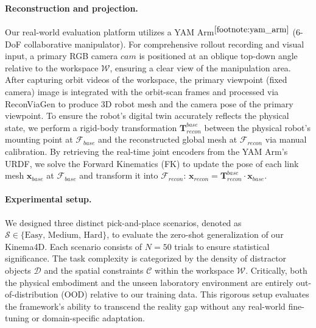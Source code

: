 \begin{appendices}
\paragraph{Reconstruction and projection.}
Our real-world evaluation platform utilizes a YAM Arm$^{\ref{footnote:yam_arm}}$ (6-DoF collaborative manipulator). 
For comprehensive rollout recording and visual input, a primary RGB camera $cam$ is positioned at an oblique top-down angle relative to the workspace $\mathcal{W}$, ensuring a clear view of the manipulation area. After capturing orbit videos of the workspace, the primary viewpoint (fixed camera) image is integrated with the orbit-scan frames and processed via ReconViaGen \cite{chang2025reconviagen} to produce 3D robot mesh and the camera pose of the primary viewpoint. To ensure the robot's digital twin accurately reflects the physical state, we perform a rigid-body transformation $\mathbf{T}_{recon}^{base}$ between the physical robot's mounting point at $\mathcal{F}_{base}$ and the reconstructed global mesh at $\mathcal{F}_{recon}$ via manual calibration. 
By retrieving the real-time joint encoders from the YAM Arm’s URDF, we solve the Forward Kinematics (FK) to update the pose of each link mesh $\mathbf{x}_{base}$ at $\mathcal{F}_{base}$ and transform it into $\mathcal{F}_{recon}$: $\mathbf{x}_{recon} = \mathbf{T}_{recon}^{base} \cdot \mathbf{x}_{base} $. 

\paragraph{Experimental setup.}
We designed three distinct pick-and-place scenarios, denoted as $\mathcal{S} \in \{ \text{Easy, Medium, Hard} \}$, to evaluate the zero-shot generalization of our Kinema4D. Each scenario consists of $N=50$ trials to ensure statistical significance. The task complexity is categorized by the density of distractor objects $\mathcal{D}$ and the spatial constraints $\mathcal{C}$ within the workspace $\mathcal{W}$. Critically, both the physical embodiment and the unseen laboratory environment are entirely out-of-distribution (OOD) relative to our training data. This rigorous setup evaluates the framework's ability to transcend the reality gap without any real-world fine-tuning or domain-specific adaptation.


\end{appendices}
